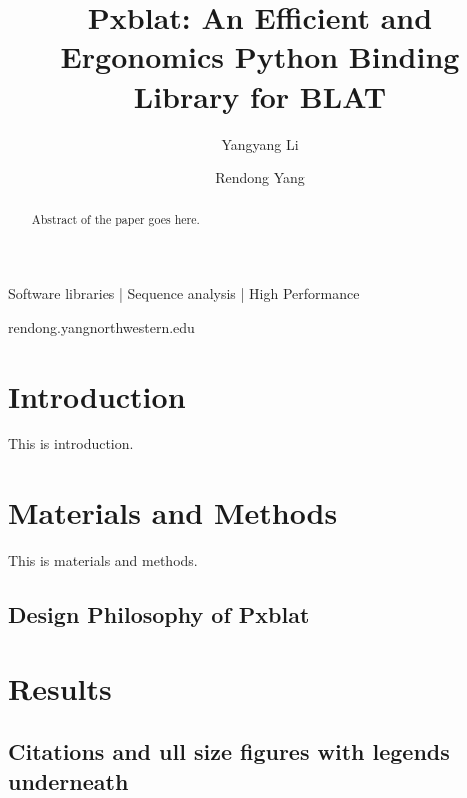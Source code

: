 
\title{Pxblat: An Efficient and Ergonomics Python Binding Library for BLAT}

\author[1]{Yangyang Li}
\author[1,\Letter]{Rendong Yang }
\date{}

\maketitle

\begin{abstract}
	Abstract of the paper goes here.
\end{abstract}


\begin{keywords}
	Software libraries |  Sequence analysis | High Performance
\end{keywords}

\begin{corrauthor}
	rendong.yang\at northwestern.edu
\end{corrauthor}

\section*{Introduction}\label{s:introduction}

This is introduction.

\section*{Materials and Methods}\label{s:materials-and-methods}

This is materials and methods.

\subsection*{Design Philosophy of Pxblat}\label{s:design-philosophy-of-pxblat}

\section*{Results}\label{s:results}

\subsection*{Citations and ull size figures with legends underneath}

